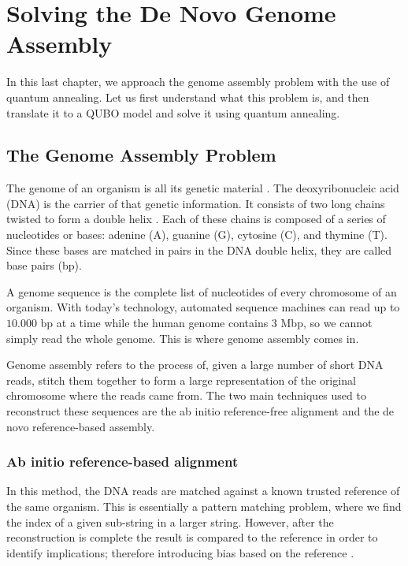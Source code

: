 \chapter{Solving the De Novo Genome Assembly}


In this last chapter, we approach the genome assembly problem with the use of quantum annealing. Let us first understand what this problem is, and then translate it to a QUBO model and solve it using quantum annealing.


\section{The Genome Assembly Problem}


The genome of an organism is all its genetic material \cite{Roth2019}. The deoxyribonucleic acid (DNA) is the carrier of that genetic information. It consists of two long chains twisted to form a double helix \cite{Alberts2007}. Each of these chains is composed of a series of nucleotides or bases: adenine (A), guanine (G), cytosine (C), and thymine (T). Since these bases are matched in pairs in the DNA double helix, they are called base pairs (bp).

A genome sequence is the complete list of nucleotides of every chromosome of an organism. With today's technology, automated sequence machines can read up to $10.000$ bp at a time \cite{Reinert1015} while the human genome contains 3 Mbp, so we cannot simply read the whole genome. This is where genome assembly comes in.

Genome assembly refers to the process of, given a large number of short DNA reads, stitch them together to form a large representation of the original chromosome where the reads came from. The two main techniques used to reconstruct these sequences are the ab initio reference-free alignment and the de novo reference-based assembly.


\subsection{Ab initio reference-based alignment}


In this method, the DNA reads are matched against a known trusted reference of the same organism. This is essentially a pattern matching problem, where we find the index of a given sub-string in a larger string. However, after the reconstruction is complete the result is compared to the reference in order to identify implications; therefore introducing bias based on the reference \cite{Sarkar2020}.

